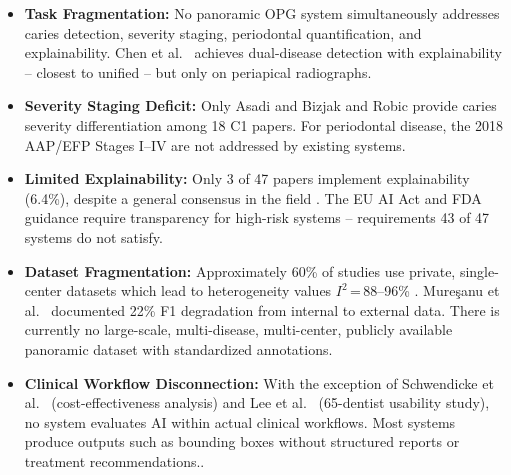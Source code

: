 \documentclass[conference]{IEEEtran}
\begin{document}
\begin{itemize}
    \item \textbf{Task Fragmentation:} No panoramic OPG system
          simultaneously addresses caries detection, severity staging,
          periodontal quantification, and explainability. Chen et al.\
          \cite{chen2023deep} achieves dual-disease detection with
          explainability -- closest to unified -- but only on periapical
          radiographs.

    \item \textbf{Severity Staging Deficit:} Only Asadi
          \cite{asadi2024detection} and Bizjak and Robic
          \cite{bizjak2024advancing} provide caries severity
          differentiation among 18 C1 papers. For periodontal disease,
          the 2018 AAP/EFP Stages I--IV \cite{chmielewski20252018} are
          not addressed by existing systems.

    \item \textbf{Limited Explainability:} Only 3 of 47 papers
          implement explainability (6.4\%), despite a general consensus in the field
          \cite{nassiri2025yolo,gamal2025automated,sastika2025ai,
          ferrara2025applications,khubrani2025detection}. The EU AI Act
          and FDA guidance require transparency for high-risk systems --
          requirements 43 of 47 systems do not satisfy.

    \item \textbf{Dataset Fragmentation:} Approximately 60\% of studies
          use private, single-center datasets which lead to heterogeneity
          values $I^2$\,=\,88--96\%
          \cite{iacob2025automated,albano2024artificial,bonfanti2025deep}.
          Mure\c{s}anu et al.\ \cite{muresanu2024automating} documented
          22\% F1 degradation from internal to external data. There is currently no large-scale, multi-disease, multi-center, publicly available panoramic dataset with standardized annotations.

    \item \textbf{Clinical Workflow Disconnection:} With the exception of 
          Schwendicke et al.\ \cite{schwendicke2021cost}
          (cost-effectiveness analysis) and Lee et al.\
          \cite{lee2025evaluation} (65-dentist usability study), no system evaluates AI within actual clinical workflows. Most systems produce outputs such as bounding boxes without structured reports or treatment recommendations..
\end{itemize}
\end{document}

